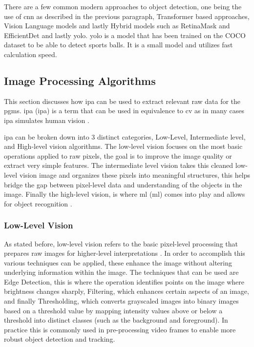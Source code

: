 \documentclass[12pt,a4paper]{article}
\begin{document}
There are a few common modern approaches to object detection, one being the use of \acs{cnn} as described in the previous paragraph, Transformer based approaches, Vision Language models and lastly Hybrid models such as RetinaMask and EfficientDet\parencite{sapkota2025rf} and lastly \acs{yolo}. \acs{yolo} is a model that has been trained on the COCO dataset to be able to detect sports balls. It is a small model and utilizes fast calculation speed.

\subsection{Image Processing Algorithms}
This section discusses how \acs{ipa} can be used to extract relevant raw data for the \acs{pgm}s. \acl{ipa} (\acs{ipa}) is a term that can be used in equivalence to \acs{cv} as in many cases \acs{ipa} simulates human vision \parencite{pitas2000}. 

\acs{ipa} can be broken down into 3 distinct categories, Low-Level, Intermediate level, and High-level vision algorithms. The low-level vision focuses on the most basic operations applied to raw pixels, the goal is to improve the image quality or extract very simple features. The intermediate level vision takes this cleaned low-level vision image and organizes these pixels into meaningful structures, this helps bridge the gap between pixel-level data and understanding of the objects in the image. Finally the high-level vision, is where \acl{ml} (\acs{ml}) comes into play and allows for object recognition \parencite{pitas2000}.

\subsubsection{Low-Level Vision}
As stated before, low-level vision refers to the basic pixel-level processing that prepares raw images for higher-level interpretations \parencite{ji2013_3dvision_intro}. In order to accomplish this various techniques can be applied, these enhance the image without altering underlying information within the image. The techniques that can be used are Edge Detection, this is where the operation identifies points on the image where brightness changes sharply, Filtering, which enhances certain aspects of an image, and finally Thresholding, which converts grayscaled images into binary images based on a threshold value \parencite{metaeye} by mapping intensity values above or below a threshold into distinct classes (such as the background and foreground). In practice this is commonly used in pre-processing video frames to enable more robust object detection and tracking.
\end{document}
